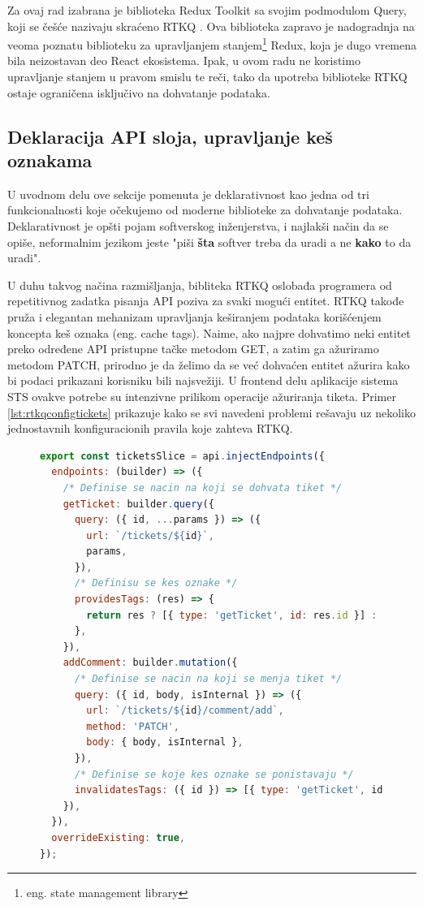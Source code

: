 \documentclass[12pt,oneside]{memoir}
\begin{document}
Za ovaj rad izabrana je biblioteka Redux Toolkit sa svojim podmodulom Query, koji se češće nazivaju skraćeno RTKQ \cite{rtkqdocs}. Ova biblioteka zapravo je nadogradnja na veoma poznatu biblioteku za upravljanjem stanjem\footnote{eng. state management library} Redux, koja je dugo vremena bila neizostavan deo React ekosistema. Ipak, u ovom radu ne koristimo upravljanje stanjem u pravom smislu te reči, tako da upotreba biblioteke RTKQ ostaje ograničena isključivo na dohvatanje podataka.

\subsection{Deklaracija API sloja, upravljanje keš oznakama}
U uvodnom delu ove sekcije pomenuta je deklarativnost kao jedna od tri funkcionalnosti koje očekujemo od moderne biblioteke za dohvatanje podataka. Deklarativnost je opšti pojam softverskog inženjerstva, i najlakši način da se opiše, neformalnim jezikom jeste "piši \textbf{šta} softver treba da uradi a ne \textbf{kako} to da uradi".

U duhu takvog načina razmišljanja, bibliteka RTKQ oslobađa programera od repetitivnog zadatka pisanja API poziva za svaki mogući entitet. RTKQ takođe pruža i elegantan mehanizam upravljanja keširanjem podataka korišćenjem koncepta keš oznaka (eng. cache tags). Naime, ako najpre dohvatimo neki entitet preko određene API pristupne tačke metodom GET, a zatim ga ažuriramo metodom PATCH, prirodno je da želimo da se već dohvaćen entitet ažurira kako bi podaci prikazani korisniku  bili najsvežiji. U frontend delu aplikacije sistema STS ovakve potrebe su intenzivne prilikom operacije ažuriranja tiketa.  Primer \ref{lst:rtkqconfigtickets} prikazuje kako se svi navedeni problemi rešavaju uz nekoliko jednostavnih konfiguracionih pravila koje zahteva RTKQ.

\begin{figure}[h]
\begin{lstlisting}[language=JavaScript, style=ES6, caption={Konfiguracija API poziva za dohvatanje tiketa i dodavanje komentara}, label={lst:rtkqconfigtickets}]
export const ticketsSlice = api.injectEndpoints({
  endpoints: (builder) => ({
    /* Definise se nacin na koji se dohvata tiket */
    getTicket: builder.query({
      query: ({ id, ...params }) => ({
        url: `/tickets/${id}`,
        params,
      }),
      /* Definisu se kes oznake */
      providesTags: (res) => {
        return res ? [{ type: 'getTicket', id: res.id }] : [];
      },
    }),
    addComment: builder.mutation({
      /* Definise se nacin na koji se menja tiket */
      query: ({ id, body, isInternal }) => ({
        url: `/tickets/${id}/comment/add`,
        method: 'PATCH',
        body: { body, isInternal },
      }),
      /* Definise se koje kes oznake se ponistavaju */
      invalidatesTags: ({ id }) => [{ type: 'getTicket', id }],
    }),
  }),
  overrideExisting: true,
});
\end{lstlisting}
\end{figure}
\end{document}

